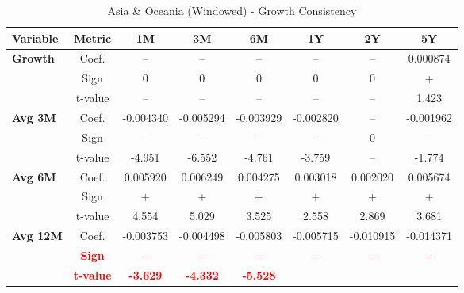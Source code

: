 \documentclass[11pt,english,a4paper,hidelinks]{book}
\begin{document}
\begin{table}[H]
    \centering
    \caption{Asia \& Oceania (Windowed) - Growth Consistency}
    \begin{tabular}{lccccccc}
        \toprule
        \textbf{Variable} & \textbf{Metric} & \textbf{1M} & \textbf{3M} & \textbf{6M} & \textbf{1Y} & \textbf{2Y} & \textbf{5Y} \\
        \midrule
        \multirow{3}{*}{\textbf{Growth}}
            & Coef.   & --        & --        & --        & --        & --        & 0.000874  \\
            & Sign    & 0         & 0         & 0         & 0         & 0         & +         \\
            & t-value & --        & --        & --        & --        & --        & 1.423     \\
        \cmidrule{1-8}
        \multirow{3}{*}{\textbf{Avg 3M}}
            & Coef.   & -0.004340 & -0.005294 & -0.003929 & -0.002820 & --        & -0.001962 \\
            & Sign    & –         & –         & –         & –         & 0         & –         \\
            & t-value & -4.951    & -6.552    & -4.761    & -3.759    & --        & -1.774    \\
        \cmidrule{1-8}
        \multirow{3}{*}{\textbf{Avg 6M}}
            & Coef.   & 0.005920  & 0.006249  & 0.004275  & 0.003018  & 0.002020  & 0.005674  \\
            & Sign    & +         & +         & +         & +         & +         & +         \\
            & t-value & 4.554     & 5.029     & 3.525     & 2.558     & 2.869     & 3.681     \\
        \cmidrule{1-8}
        \multirow{3}{*}{\textbf{Avg 12M}}
            & Coef.   & -0.003753 & -0.004498 & -0.005803 & -0.005715 & -0.010915 & -0.014371 \\
            & \textbf{\textcolor{red}{Sign}}
                     & \textbf{\textcolor{red}{–}}
                     & \textbf{\textcolor{red}{–}}
                     & \textbf{\textcolor{red}{–}}
                     & \textbf{\textcolor{red}{–}}
                     & \textbf{\textcolor{red}{–}}
                     & \textbf{\textcolor{red}{–}} \\
            & \textbf{\textcolor{red}{t-value}}
                     & \textbf{\textcolor{red}{-3.629}}
                     & \textbf{\textcolor{red}{-4.332}}
                     & \textbf{\textcolor{red}{-5.528}}

\end{tabular}
\end{table}
\end{document}
